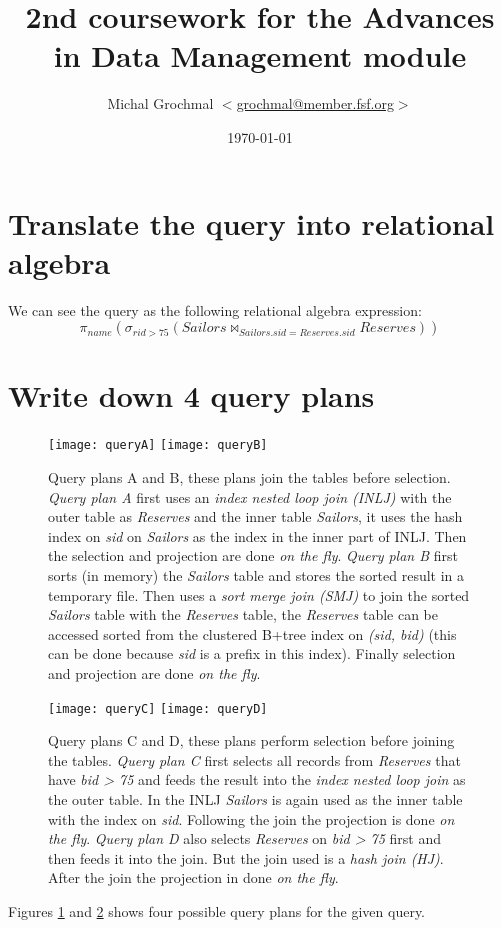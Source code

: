 \documentclass[a4paper,12pt]{article}
\title{2nd coursework for the Advances in Data Management module}
\author{Michal Grochmal
  $<$\href{mailto:grochmal@member.fsf.org}{grochmal@member.fsf.org}$>$
}
\date{\today}
\begin{document}
\maketitle

\section[Relational algebra]{Translate the query into relational algebra}
We can see the query as the following relational algebra expression:
\begin{equation*}
\pi_{name} (\sigma_{rid > 75}
             (Sailors \Join_{Sailors.sid = Reserves.sid} Reserves))
\end{equation*}

\section[Query plans]{Write down 4 query plans}
\begin{figure}[!htp]
\centering
  \texttt{[image: queryA]}
  \texttt{[image: queryB]}
\caption{Query plans A and B, these plans join the tables before selection.
\emph{Query plan A} first uses an \emph{index nested loop join (INLJ)} with the
outer table as \emph{Reserves} and the inner table \emph{Sailors}, it uses the
hash index on \emph{sid} on \emph{Sailors} as the index in the inner part of
INLJ.  Then the selection and projection are done \emph{on the fly}.
\emph{Query plan B} first sorts (in memory) the \emph{Sailors} table and stores
the sorted result in a temporary file.  Then uses a \emph{sort merge join
(SMJ)} to join the sorted \emph{Sailors} table with the \emph{Reserves} table,
the \emph{Reserves} table can be accessed sorted from the clustered B+tree
index on \emph{(sid, bid)} (this can be done because \emph{sid} is a prefix in
this index).  Finally selection and projection are done \emph{on the fly}.}
\label{figAB}
\end{figure}
\begin{figure}[!htp]
\centering
  \texttt{[image: queryC]}
  \texttt{[image: queryD]}
\caption{Query plans C and D, these plans perform selection before joining the
tables.  \emph{Query plan C} first selects all records from \emph{Reserves}
that have \emph{bid > 75} and feeds the result into the \emph{index nested loop
join} as the outer table.  In the INLJ \emph{Sailors} is again used as the
inner table with the index on \emph{sid}.  Following the join the projection is
done \emph{on the fly}.  \emph{Query plan D} also selects \emph{Reserves} on
\emph{bid > 75} first and then feeds it into the join.  But the join used is a
\emph{hash join (HJ)}.  After the join the projection in done \emph{on the
fly}.}
\label{figCD}
\end{figure}
Figures \ref{figAB} and \ref{figCD} shows four possible query plans for the
given query.
\end{document}
